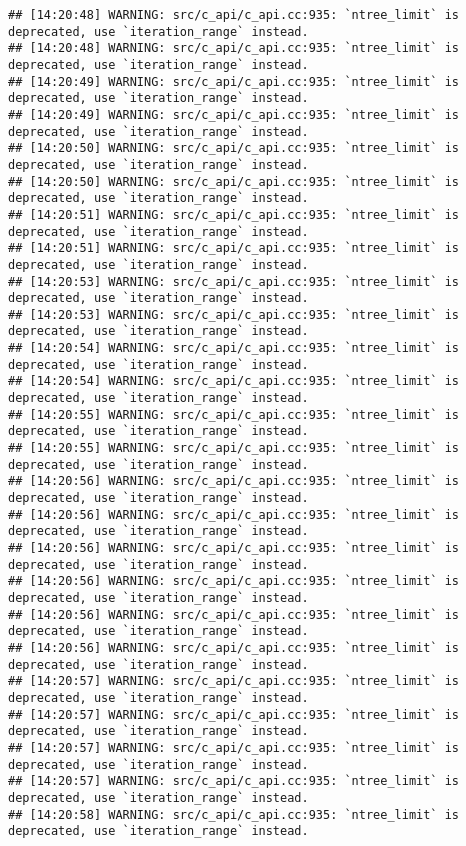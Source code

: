\documentclass[
]{article}
\begin{document}
\begin{verbatim}
## [14:20:48] WARNING: src/c_api/c_api.cc:935: `ntree_limit` is deprecated, use `iteration_range` instead.
## [14:20:48] WARNING: src/c_api/c_api.cc:935: `ntree_limit` is deprecated, use `iteration_range` instead.
## [14:20:49] WARNING: src/c_api/c_api.cc:935: `ntree_limit` is deprecated, use `iteration_range` instead.
## [14:20:49] WARNING: src/c_api/c_api.cc:935: `ntree_limit` is deprecated, use `iteration_range` instead.
## [14:20:50] WARNING: src/c_api/c_api.cc:935: `ntree_limit` is deprecated, use `iteration_range` instead.
## [14:20:50] WARNING: src/c_api/c_api.cc:935: `ntree_limit` is deprecated, use `iteration_range` instead.
## [14:20:51] WARNING: src/c_api/c_api.cc:935: `ntree_limit` is deprecated, use `iteration_range` instead.
## [14:20:51] WARNING: src/c_api/c_api.cc:935: `ntree_limit` is deprecated, use `iteration_range` instead.
## [14:20:53] WARNING: src/c_api/c_api.cc:935: `ntree_limit` is deprecated, use `iteration_range` instead.
## [14:20:53] WARNING: src/c_api/c_api.cc:935: `ntree_limit` is deprecated, use `iteration_range` instead.
## [14:20:54] WARNING: src/c_api/c_api.cc:935: `ntree_limit` is deprecated, use `iteration_range` instead.
## [14:20:54] WARNING: src/c_api/c_api.cc:935: `ntree_limit` is deprecated, use `iteration_range` instead.
## [14:20:55] WARNING: src/c_api/c_api.cc:935: `ntree_limit` is deprecated, use `iteration_range` instead.
## [14:20:55] WARNING: src/c_api/c_api.cc:935: `ntree_limit` is deprecated, use `iteration_range` instead.
## [14:20:56] WARNING: src/c_api/c_api.cc:935: `ntree_limit` is deprecated, use `iteration_range` instead.
## [14:20:56] WARNING: src/c_api/c_api.cc:935: `ntree_limit` is deprecated, use `iteration_range` instead.
## [14:20:56] WARNING: src/c_api/c_api.cc:935: `ntree_limit` is deprecated, use `iteration_range` instead.
## [14:20:56] WARNING: src/c_api/c_api.cc:935: `ntree_limit` is deprecated, use `iteration_range` instead.
## [14:20:56] WARNING: src/c_api/c_api.cc:935: `ntree_limit` is deprecated, use `iteration_range` instead.
## [14:20:56] WARNING: src/c_api/c_api.cc:935: `ntree_limit` is deprecated, use `iteration_range` instead.
## [14:20:57] WARNING: src/c_api/c_api.cc:935: `ntree_limit` is deprecated, use `iteration_range` instead.
## [14:20:57] WARNING: src/c_api/c_api.cc:935: `ntree_limit` is deprecated, use `iteration_range` instead.
## [14:20:57] WARNING: src/c_api/c_api.cc:935: `ntree_limit` is deprecated, use `iteration_range` instead.
## [14:20:57] WARNING: src/c_api/c_api.cc:935: `ntree_limit` is deprecated, use `iteration_range` instead.
## [14:20:58] WARNING: src/c_api/c_api.cc:935: `ntree_limit` is deprecated, use `iteration_range` instead.

\end{verbatim}
\end{document}
